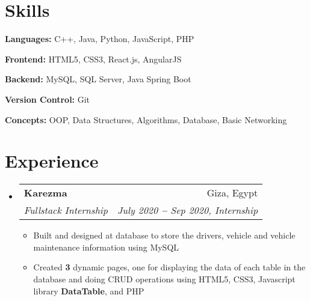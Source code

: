 \documentclass[letterpaper,11pt]{article}
\makeatletter
\newcommand{\resumeItem}[1]{
  \item\small{
    {#1 \vspace{-2pt}}
  }
}
\newcommand{\resumeSubheading}[4]{
  \vspace{-2pt}\item
    \begin{tabular*}{0.97\textwidth}[t]{l@{\extracolsep{\fill}}r}
      \textbf{#1} & #2 \\
      \textit{\small#3} & \textit{\small #4} \\
    \end{tabular*}\vspace{-7pt}
}
\newcommand{\resumeSubHeadingListStart}{\begin{itemize}[leftmargin=0.15in, label={}]}
\newcommand{\resumeSubHeadingListEnd}{\end{itemize}}
\newcommand{\resumeItemListStart}{\begin{itemize}}
\newcommand{\resumeItemListEnd}{\end{itemize}\vspace{-5pt}}
\makeatother
\begin{document}
\section{Skills}
  \vspace{2pt}
  \resumeSubHeadingListStart
    \small{\item{
        
        \textbf{Languages:}{ C++, Java, Python, JavaScript, PHP} \\ \vspace{3pt}
        
        \textbf{Frontend:}{ HTML5, CSS3, React.js, AngularJS} \\ 
        \vspace{3pt}

		\textbf{Backend:}{ MySQL, SQL Server, Java Spring Boot} \\ 
		\vspace{3pt}   
		
		\textbf{Version Control:}{ Git} \\ 
		\vspace{3pt}   
				    
        \textbf{Concepts:}{ OOP, Data Structures, Algorithms, Database, Basic Networking} \\ 
        \vspace{3pt}
        
    }}
  \resumeSubHeadingListEnd




\section{Experience}
  \vspace{3pt}
  \resumeSubHeadingListStart


    \resumeSubheading
      {Karezma}{Giza, Egypt}
      {Fullstack Internship}{July 2020 \textbf{--} Sep 2020, Internship}
        \resumeItemListStart
        	\resumeItem{Built and designed at database to store the drivers, vehicle and vehicle maintenance information using MySQL}
        	\resumeItem{Created \textbf{3} dynamic pages, one for displaying the data of each table in the database and doing CRUD operations using HTML5, CSS3, Javascript library \textbf{DataTable}, and PHP}
        \resumeItemListEnd
  
  \resumeSubHeadingListEnd
\end{document}
